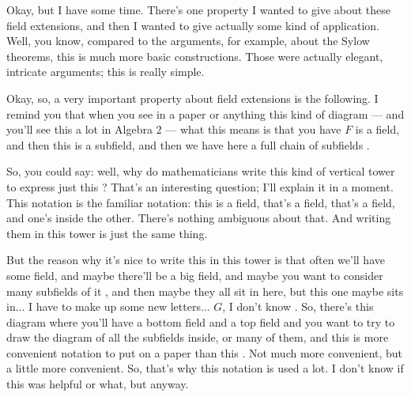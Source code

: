 \begin{speech}[00:17:35 - 00:19:53]
Okay, but I have some time. There's one property I wanted to give about these field extensions, and then I wanted to give actually some kind of application. Well, you know, compared to the arguments, for example, about the Sylow theorems, this is much more basic constructions. Those were actually elegant, intricate arguments; this is really simple.

Okay, so, a very important property about field extensions is the following. I remind you that when you see in a paper or anything this kind of diagram  --- and you'll see this a lot in Algebra $2$ --- what this means is that you have $F$ is a field, and then this is a subfield, and then we have here a full chain of subfields .

So, you could say: well, why do mathematicians write this kind of vertical tower to express just this ? That's an interesting question; I'll explain it in a moment. This notation is the familiar notation: this is a field, that's a field, that's a field, and one's inside the other. There's nothing ambiguous about that. And writing them in this tower is just the same thing.

But the reason why it's nice to write this in this tower is that often we'll have some field, and maybe there'll be a big field, and maybe you want to consider many subfields of it , and then maybe they all sit in here, but this one maybe sits in... I have to make up some new letters... $G$, I don't know . So, there's this diagram where you'll have a bottom field and a top field and you want to try to draw the diagram of all the subfields inside, or many of them, and this is more convenient notation to put on a paper than this . Not much more convenient, but a little more convenient. So, that's why this notation is used a lot. I don't know if this was helpful or what, but anyway.
\end{speech}

